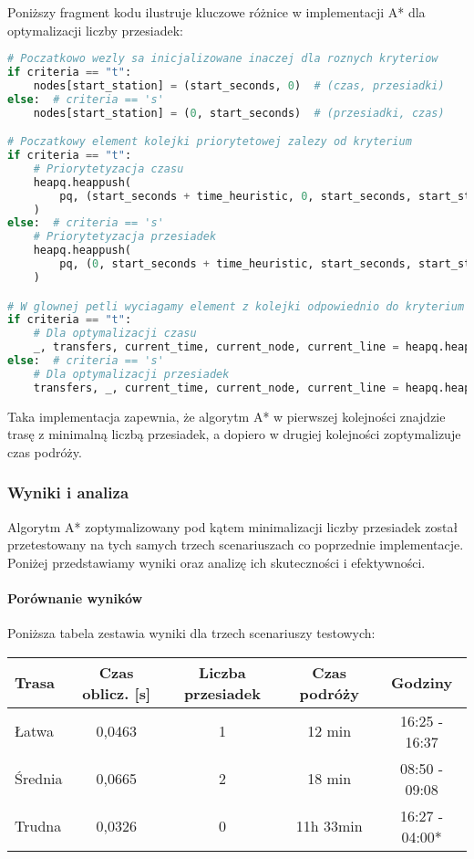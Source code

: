 \documentclass[12pt,a4paper]{article}
\begin{document}
Poniższy fragment kodu ilustruje kluczowe różnice w implementacji A* dla optymalizacji liczby przesiadek:

\begin{lstlisting}[language=Python]
# Poczatkowo wezly sa inicjalizowane inaczej dla roznych kryteriow
if criteria == "t":
    nodes[start_station] = (start_seconds, 0)  # (czas, przesiadki)
else:  # criteria == 's'
    nodes[start_station] = (0, start_seconds)  # (przesiadki, czas)

# Poczatkowy element kolejki priorytetowej zalezy od kryterium
if criteria == "t":
    # Priorytetyzacja czasu
    heapq.heappush(
        pq, (start_seconds + time_heuristic, 0, start_seconds, start_station, None)
    )
else:  # criteria == 's'
    # Priorytetyzacja przesiadek
    heapq.heappush(
        pq, (0, start_seconds + time_heuristic, start_seconds, start_station, None)
    )

# W glownej petli wyciagamy element z kolejki odpowiednio do kryterium
if criteria == "t":
    # Dla optymalizacji czasu
    _, transfers, current_time, current_node, current_line = heapq.heappop(pq)
else:  # criteria == 's'
    # Dla optymalizacji przesiadek
    transfers, _, current_time, current_node, current_line = heapq.heappop(pq
\end{lstlisting}

Taka implementacja zapewnia, że algorytm A* w pierwszej kolejności znajdzie trasę z minimalną liczbą przesiadek, a dopiero w drugiej kolejności zoptymalizuje czas podróży.

\subsubsection{Wyniki i analiza}
Algorytm A* zoptymalizowany pod kątem minimalizacji liczby przesiadek został przetestowany na tych samych trzech scenariuszach co poprzednie implementacje. Poniżej przedstawiamy wyniki oraz analizę ich skuteczności i efektywności.

\paragraph{Porównanie wyników}
Poniższa tabela zestawia wyniki dla trzech scenariuszy testowych:

\begin{center}
\begin{tabular}{|l|c|c|c|c|}
\hline
\textbf{Trasa} & \textbf{Czas oblicz. [s]} & \textbf{Liczba przesiadek} & \textbf{Czas podróży} & \textbf{Godziny}\\
\hline
Łatwa & 0,0463 & 1 & 12 min & 16:25 - 16:37 \\
Średnia & 0,0665 & 2 & 18 min & 08:50 - 09:08 \\
Trudna & 0,0326 & 0 & 11h 33min & 16:27 - 04:00* \\
\hline
\end{tabular}
\end{center}
\end{document}
